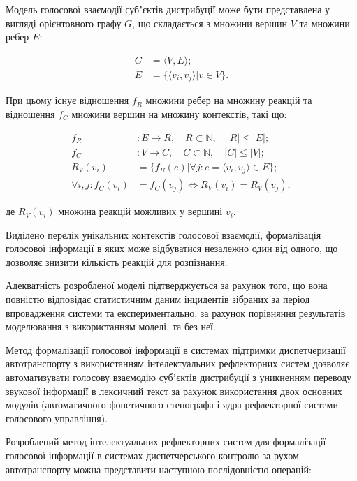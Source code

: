 Модель голосової взаємодії субʼєктів дистрибуції може бути представлена у вигляді орієнтовного графу $G$, що складається з множини вершин $V$ та множини ребер $E$:

\begin{align}
G&=\langle V,E\rangle; \nonumber\\
E&=\{\langle v_i,v_j\rangle | v \in V\}. \nonumber
\end{align}

При цьому існує відношення $f_R$ множини ребер на множину реакцій та відношення $f_C$ множини вершин на множину контекстів, такі що:

\begin{align}
f_R&: E \rightarrow R,\quad R\subset\mathbb{N},\quad |R|\le|E|; \nonumber\\
f_C&: V \rightarrow C,\quad C\subset\mathbb{N},\quad|C|\le|V|; \nonumber\\
R_V(v_i) &= \{f_R(e)|\forall j:e=\langle v_i,v_j\rangle \in E\}; \nonumber\\
\forall i,j: f_C(v_i)&=f_C(v_j) \iff R_V(v_i) = R_V(v_j), \nonumber
\end{align}

\noindent
де $R_V(v_i)$ множина реакцій можливих у вершині $v_i$.

Виділено перелік унікальних контекстів голосової взаємодії, формалізація голосової інформації в яких може відбуватися незалежно один від одного, що дозволяє знизити кількість реакцій для розпізнання.

Адекватність розробленої моделі підтверджується за рахунок того, що вона повністю відповідає статистичним даним інцидентів зібраних за період впровадження системи та експериментально, за рахунок порівняння результатів моделювання з використанням моделі, та без неї.

Метод формалізації голосової інформації в системах підтримки диспетчеризації автотранспорту з використанням інтелектуальних рефлекторних систем дозволяє автоматизувати голосову взаємодію субʼєктів дистрибуції з уникненням переводу звукової інформації в лексичний текст за рахунок використання двох основних модулів (автоматичного фонетичного стенографа і ядра рефлекторної системи голосового управління).

Розроблений метод інтелектуальних рефлекторних систем для формалізації голосової інформації в системах диспетчерського контролю за рухом автотранспорту можна представити наступною послідовністю операцій:

